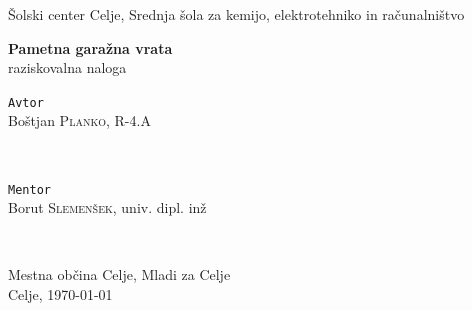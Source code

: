 \documentclass[11pt]{article}
\begin{document}
\renewcommand{\theFancyVerbLine}{
  \sffamily\textcolor[rgb]{0.5,0.5,0.5}{\scriptsize\arabic{FancyVerbLine}}}
\begin{titlepage}
\thispagestyle{empty}
   \center
   \fancyhead{}
   \large{Šolski center Celje, Srednja šola za kemijo, elektrotehniko in računalništvo}\\[1.5cm]
   \vspace*{\fill}
   \begin{center}
   \Huge{\bfseries Pametna garažna vrata}\\
   \vspace{1mm}
   \large{raziskovalna naloga}
   \end{center}
   \vspace*{\fill}

	\begin{minipage}{0.4\textwidth}
		\begin{flushleft}
		\vspace{4.5mm}
			\large
			\texttt{Avtor}\\
			Boštjan \textsc{Planko}, R-4.A \\ %
		\end{flushleft}
	\end{minipage}
	~
	\begin{minipage}{0.5\textwidth}
		\begin{flushright}
			\large
			\texttt{Mentor}\\
			Borut \textsc{Slemenšek},  univ. dipl. inž %
		\end{flushright}
	\end{minipage}
	~
	\begin{minipage}{0.5\textwidth}
		\begin{center}
		    \vspace{5mm}
		    Mestna občina Celje, Mladi za Celje\\
			\large{Celje, \monthyeardate\today}
		\end{center}
	\end{minipage}
	\fancyfoot{}
\end{titlepage}
\end{document}
